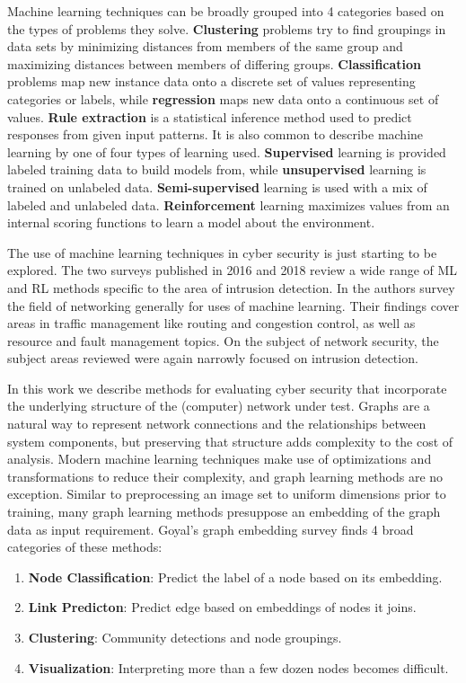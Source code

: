 
Machine learning techniques can be broadly grouped into 4 categories based on the types of problems they solve. \textbf{Clustering} problems try to find groupings in data sets by minimizing distances from members of the same group and maximizing distances between members of differing groups. \textbf{Classification} problems map new instance data onto a discrete set of values representing categories or labels, while \textbf{regression} maps new data onto a continuous set of values. \textbf{Rule extraction}\cite{Denker} is a statistical inference method used to predict responses from given input patterns. It is also common to describe machine learning by one of four types of learning used. \textbf{Supervised} learning is provided labeled training data to build models from, while \textbf{unsupervised} learning is trained on unlabeled data. \textbf{Semi-supervised} learning is used with a mix of labeled and unlabeled data. \textbf{Reinforcement} learning\cite{Sutton_Barto_2018} maximizes values from an internal scoring functions to learn a model about the environment. 

The use of machine learning techniques in cyber security is just starting to be explored. The two surveys\cite{Buczak_Guven_2016, Xin_Kong_Liu_Chen_Li_Zhu_Gao_Hou_Wang_2018} published in 2016 and 2018 review a wide range of ML and RL methods specific to the area of intrusion detection. In \cite{Boutaba_2018} the authors survey the field of networking generally for uses of machine learning. Their findings cover areas in traffic management like routing and congestion control, as well as resource and fault management topics. On the subject of network security, the subject areas reviewed were again narrowly focused on intrusion detection. 

In this work we describe methods for evaluating cyber security that incorporate the underlying structure of the (computer) network under test. Graphs are a natural way to represent network connections and the relationships between system components, but preserving that structure adds complexity to the cost of analysis. Modern machine learning techniques make use of optimizations and transformations to reduce their complexity, and graph learning methods are no exception. Similar to preprocessing an image set to uniform dimensions prior to training, many graph learning methods presuppose an embedding of the graph data as input requirement. Goyal’s graph embedding survey\cite{Goyal_Ferrara_2018} finds 4 broad categories of these methods:
\begin{enumerate}
\item \textbf{Node Classification}: Predict the label of a node based on its embedding. 
\item \textbf{Link Predicton}: Predict edge based on embeddings of nodes it joins.
\item \textbf{Clustering}: Community detections and node groupings.
\item \textbf{Visualization}: Interpreting more than a few dozen nodes becomes difficult. 
\end{enumerate}

